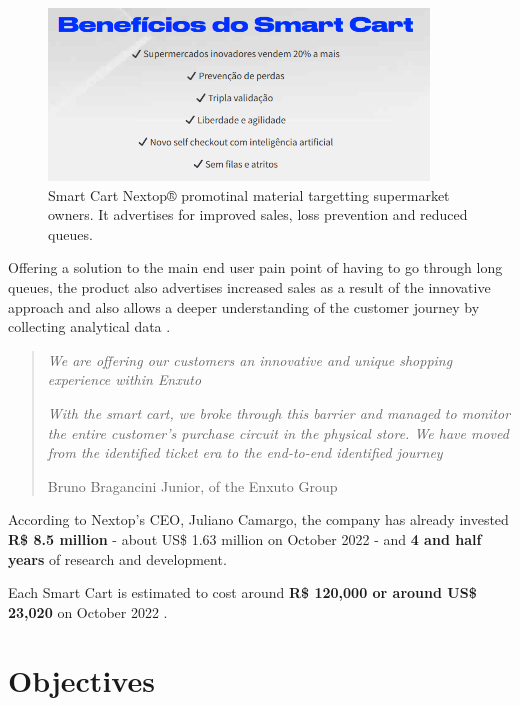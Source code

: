 \documentclass[openright]{normas-utf-tex} %
\begin{document}
\begin{figure}[H]
	\centering
	\includegraphics[width=0.9\textwidth]{./images/nextoppromo.png}
    \caption[Smart Cart Nextop® promotional material targetting supermarket owners]{Smart Cart Nextop® promotinal material targetting supermarket owners. It advertises for improved sales, loss prevention and reduced queues.}
	\label{fig:nextopui}
\end{figure}

Offering a solution to the main end user pain point of having to go through
long queues, the product also advertises increased sales as a result of the
innovative approach and also allows a deeper understanding of the customer
journey by collecting analytical data \cite{Paraiba2022}.

\begin{quote}
\textit{We are offering our customers an innovative and unique shopping experience within Enxuto}

\textit{With the smart cart, we broke through this barrier and managed to monitor the
entire customer's purchase circuit in the physical store. We have moved
from the identified ticket era to the end-to-end identified journey}

    Bruno Bragancini Junior,  of the Enxuto Group \cite{Paraiba2022}
\end{quote}

According to Nextop's CEO, Juliano Camargo, the company has already invested \textbf{R\$ 8.5 million} - about US\$ 1.63 million on October 2022 - and \textbf{4 and half years}
of research and development.

Each Smart Cart is estimated to cost around \textbf{R\$ 120,000  or around US\$ 23,020} on October 2022 \cite{Paraiba2022}.

\section{Objectives}
\end{document}
